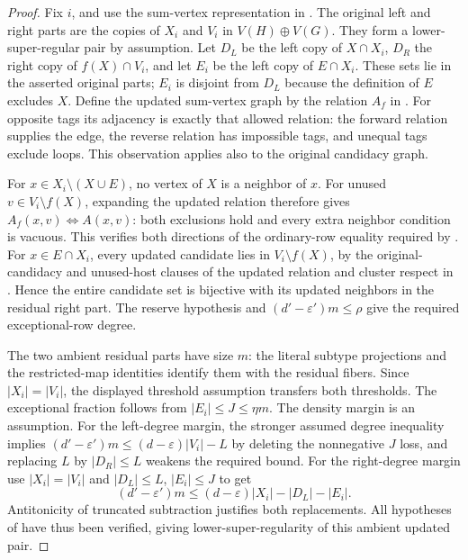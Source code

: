 \begin{proof}
Fix $i$, and use the sum-vertex representation in
. The original left and right parts
are the copies of $X_i$ and $V_i$ in $V(H)\oplus V(G)$. They form a
lower-super-regular pair by assumption. Let $D_L$ be the left copy of
$X\cap X_i$, $D_R$ the right copy of $f(X)\cap V_i$, and let $E_i$ be the
left copy of $E\cap X_i$. These sets lie in the asserted original parts;
$E_i$ is disjoint from $D_L$ because the definition of $E$ excludes $X$.
Define the updated sum-vertex graph by the relation $A_f$ in
. For opposite tags its adjacency is exactly
that allowed relation: the forward relation supplies the edge, the
reverse relation has impossible tags, and unequal tags exclude loops.
This observation applies also to the original candidacy graph.

For $x\in X_i\setminus(X\cup E)$, no vertex of $X$ is a neighbor of $x$.
For unused $v\in V_i\setminus f(X)$, expanding the updated relation
therefore gives $A_f(x,v)\iff A(x,v)$: both exclusions hold and every
extra neighbor condition is vacuous. This verifies both directions of
the ordinary-row equality required by
.
For $x\in E\cap X_i$, every updated candidate lies in
$V_i\setminus f(X)$, by the original-candidacy and unused-host clauses
of the updated relation and cluster respect in .
Hence the entire candidate set is bijective with its updated neighbors
in the residual right part. The reserve hypothesis and
$(d'-\varepsilon')m\leq\rho$ give the required exceptional-row degree.

The two ambient residual parts have size $m$: the literal subtype
projections and the restricted-map identities identify them with the
residual fibers. Since $|X_i|=|V_i|$, the displayed threshold assumption
transfers both thresholds. The exceptional fraction follows from
$|E_i|\leq J\leq\eta m$. The density margin is an assumption.
For the left-degree margin, the stronger assumed degree inequality
implies $(d'-\varepsilon')m\leq(d-\varepsilon)|V_i|-L$ by deleting
the nonnegative $J$ loss, and replacing $L$ by $|D_R|\leq L$ weakens
the required bound. For the right-degree margin use $|X_i|=|V_i|$ and
$|D_L|\leq L$, $|E_i|\leq J$ to get
\[
 (d'-\varepsilon')m\leq(d-\varepsilon)|X_i|-|D_L|-|E_i|.
\]
Antitonicity of truncated subtraction justifies both replacements.
All hypotheses of  have thus
been verified, giving lower-super-regularity of this ambient updated pair.


\end{proof}
